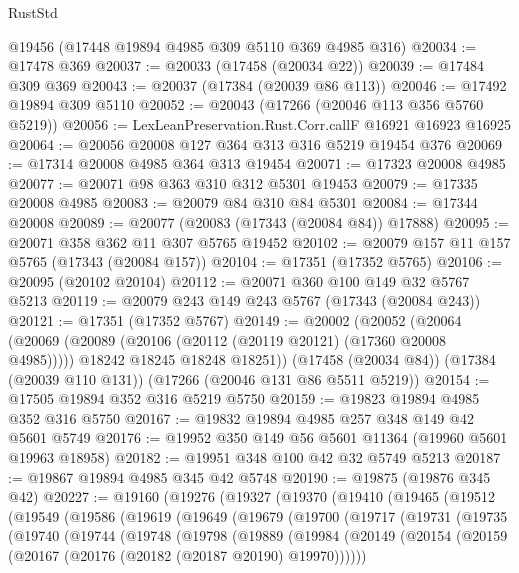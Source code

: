 \begin{lexlean}{RustStd}
\begin{coremodule}
    @19456
    (@17448 @19894 @4985 @309 @5110 @369 @4985 @316)
@20034 := @17478 @369
@20037 := @20033 (@17458 (@20034 @22))
@20039 := @17484 @309 @369
@20043 := @20037 (@17384 (@20039 @86 @113))
@20046 := @17492 @19894 @309 @5110
@20052 := @20043 (@17266 (@20046 @113 @356 @5760 @5219))
@20056 := LexLeanPreservation.Rust.Corr.callF @16921 @16923 @16925
@20064 := @20056 @20008 @127 @364 @313 @316 @5219 @19454 @376
@20069 := @17314 @20008 @4985 @364 @313 @19454
@20071 := @17323 @20008 @4985
@20077 := @20071 @98 @363 @310 @312 @5301 @19453
@20079 := @17335 @20008 @4985
@20083 := @20079 @84 @310 @84 @5301
@20084 := @17344 @20008
@20089 := @20077 (@20083 (@17343 (@20084 @84)) @17888)
@20095 := @20071 @358 @362 @11 @307 @5765 @19452
@20102 := @20079 @157 @11 @157 @5765 (@17343 (@20084 @157))
@20104 := @17351 (@17352 @5765)
@20106 := @20095 (@20102 @20104)
@20112 := @20071 @360 @100 @149 @32 @5767 @5213
@20119 := @20079 @243 @149 @243 @5767 (@17343 (@20084 @243))
@20121 := @17351 (@17352 @5767)
@20149 := @20002
    (@20052
      (@20064
        (@20069 (@20089 (@20106 (@20112 (@20119 @20121) (@17360 @20008 @4985)))))
        @18242
        @18245
        @18248
        @18251))
    (@17458 (@20034 @84))
    (@17384 (@20039 @110 @131))
    (@17266 (@20046 @131 @86 @5511 @5219))
@20154 := @17505 @19894 @352 @316 @5219 @5750
@20159 := @19823 @19894 @4985 @352 @316 @5750
@20167 := @19832 @19894 @4985 @257 @348 @149 @42 @5601 @5749
@20176 := @19952 @350 @149 @56 @5601 @11364 (@19960 @5601 @19963 @18958)
@20182 := @19951 @348 @100 @42 @32 @5749 @5213
@20187 := @19867 @19894 @4985 @345 @42 @5748
@20190 := @19875 (@19876 @345 @42)
@20227 := @19160
    (@19276
      (@19327
        (@19370
          (@19410
            (@19465
              (@19512
                (@19549
                  (@19586
                    (@19619
                      (@19649
                        (@19679
                          (@19700
                            (@19717
                              (@19731
                                (@19735
                                  (@19740
                                    (@19744
                                      (@19748
                                        (@19798
                                          (@19889
                                            (@19984
                                              (@20149
                                                (@20154
                                                  (@20159
                                                    (@20167
                                                      (@20176 (@20182 (@20187 @20190) @19970))))))

\end{coremodule}
\end{lexlean}
